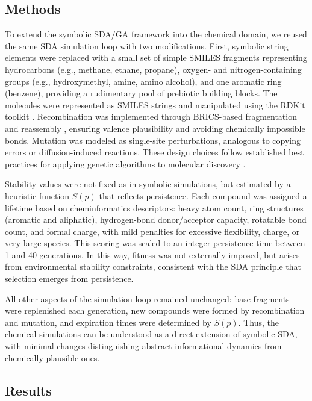 \documentclass[life,article,submit,pdftex,moreauthors]{Definitions/mdpi}
\begin{document}
\subsection{Methods}
To extend the symbolic SDA/GA framework into the chemical domain, we reused the same SDA simulation loop with two modifications. First, symbolic string elements were replaced with a small set of simple SMILES fragments representing hydrocarbons (e.g., methane, ethane, propane), oxygen- and nitrogen-containing groups (e.g., hydroxymethyl, amine, amino alcohol), and one aromatic ring (benzene), providing a rudimentary pool of prebiotic building blocks. The molecules were represented as SMILES strings and manipulated using the RDKit toolkit \cite{landrum2006rdkit}. Recombination was implemented through BRICS-based fragmentation and reassembly \cite{degen2008art}, ensuring valence plausibility and avoiding chemically impossible bonds. Mutation was modeled as single-site perturbations, analogous to copying errors or diffusion-induced reactions. These design choices follow established best practices for applying genetic algorithms to molecular discovery \cite{janet2023bestpractices}.

Stability values were not fixed as in symbolic simulations, but estimated by a heuristic function $S(p)$ that reflects persistence. Each compound was assigned a lifetime based on cheminformatics descriptors: heavy atom count, ring structures (aromatic and aliphatic), hydrogen-bond donor/acceptor capacity, rotatable bond count, and formal charge, with mild penalties for excessive flexibility, charge, or very large species. This scoring was scaled to an integer persistence time between 1 and 40 generations. In this way, fitness was not externally imposed, but arises from environmental stability constraints, consistent with the SDA principle that selection emerges from persistence.

All other aspects of the simulation loop remained unchanged: base fragments were replenished each generation, new compounds were formed by recombination and mutation, and expiration times were determined by $S(p)$. Thus, the chemical simulations can be understood as a direct extension of symbolic SDA, with minimal changes distinguishing abstract informational dynamics from chemically plausible ones.



\subsection{Results}
\end{document}
